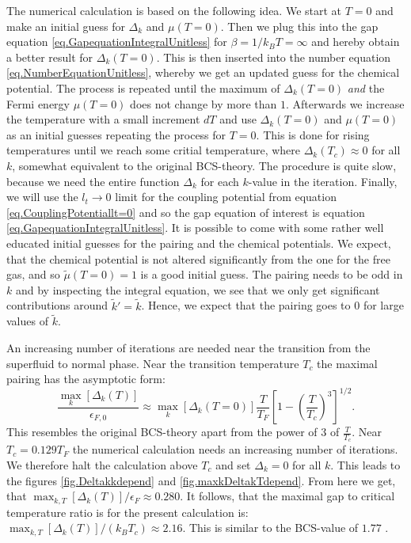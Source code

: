 The numerical calculation is based on the following idea. We start at $T = 0$ and make an initial guess for $\Delta_k$ and $\mu(T=0)$. Then we plug this into the gap equation \eqref{eq.GapequationIntegralUnitless} for $\beta = 1/k_BT = \infty$ and hereby obtain a better result for $\Delta_k(T=0)$. This is then inserted into the number equation \eqref{eq.NumberEquationUnitless}, whereby we get an updated guess for the chemical potential. The process is repeated until the maximum of $\Delta_k(T=0)$ \textit{and} the Fermi energy $\mu( T=0 )$ does not change by more than $1$\textperthousand. Afterwards we increase the temperature with a small increment $dT$ and use $\Delta_k(T=0)$ and $\mu( T=0 )$ as an initial guesses repeating the process for $T=0$. This is done for rising temperatures until we reach some critial temperature, where $\Delta_k(T_c)\approx 0$ for all $k$, somewhat equivalent to the original BCS-theory\cite{Tinkham,LandauStatPhys2,PlischkeStatPhys}. The procedure is quite slow, because we need the entire function $\Delta_k$ for each $k$-value in the iteration. Finally, we will use the $l_t \to 0$ limit for the coupling potential from equation \eqref{eq.CouplingPotentiallt=0} and so the gap equation of interest is equation \eqref{eq.GapequationIntegralUnitless}. It is possible to come with some rather well educated initial guesses for the pairing and the chemical potentials. We expect, that the chemical potential is not altered significantly from the one for the free gas, and so $\tilde{\mu}(T = 0) = 1$ is a good initial guess. The pairing needs to be odd in $k$ and by inspecting the integral equation, we see that we only get significant contributions around $\tilde{k}' = \tilde{k}$. Hence, we expect that the pairing goes to 0 for large values of $\tilde{k}$.  

An increasing number of iterations are needed near the transition from the superfluid to normal phase. Near the transition temperature $T_c$ the maximal pairing has the asymptotic form:
\begin{equation}
\frac{\max_{k}[\Delta_k(T)]}{\epsilon_{F,0}} \approx \max_k[\Delta_{k}(T=0)]\frac{T}{T_F}\left[1 - \left(\frac{T}{T_c}\right)^3\right]^{1/2}. 
\label{eq.maxpairingasymp}
\end{equation}
This resembles the original BCS-theory apart from the power of 3 of $\frac{T}{T_c}$. Near $T_c = 0.129 T_F$ the numerical calculation needs an increasing number of iterations. We therefore halt the calculation above $T_c$ and set $\Delta_k = 0$ for all $k$. This leads to the figures \ref{fig.Deltakkdepend} and \ref{fig.maxkDeltakTdepend}. From here we get, that $\max_{k,T}[\Delta_k(T)]/\epsilon_F \approx 0.280$. It follows, that the maximal gap to critical temperature ratio is for the present calculation is: $\max_{k,T}[\Delta_k(T)]/(k_B T_c) \approx 2.16$. This is similar to the BCS-value of $1.77$ \cite{BruusFlensberg}.  

